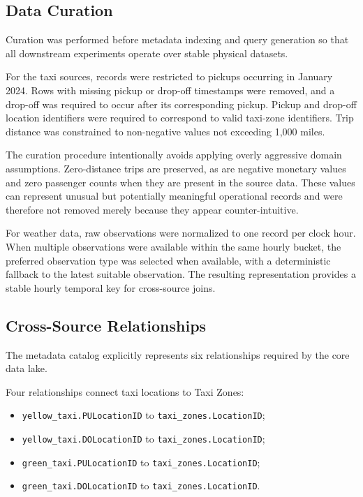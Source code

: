 \subsection{Data Curation}

Curation was performed before metadata indexing and query generation so that
all downstream experiments operate over stable physical datasets.

For the taxi sources, records were restricted to pickups occurring in January
2024. Rows with missing pickup or drop-off timestamps were removed, and a
drop-off was required to occur after its corresponding pickup. Pickup and
drop-off location identifiers were required to correspond to valid taxi-zone
identifiers. Trip distance was constrained to non-negative values not
exceeding 1,000 miles.

The curation procedure intentionally avoids applying overly aggressive domain
assumptions. Zero-distance trips are preserved, as are negative monetary
values and zero passenger counts when they are present in the source data.
These values can represent unusual but potentially meaningful operational
records and were therefore not removed merely because they appear
counter-intuitive.

For weather data, raw observations were normalized to one record per clock
hour. When multiple observations were available within the same hourly
bucket, the preferred observation type was selected when available, with a
deterministic fallback to the latest suitable observation. The resulting
representation provides a stable hourly temporal key for cross-source joins.


\subsection{Cross-Source Relationships}

The metadata catalog explicitly represents six relationships required by the
core data lake.

Four relationships connect taxi locations to Taxi Zones:

\begin{itemize}

    \item \texttt{yellow\_taxi.PULocationID} to
    \texttt{taxi\_zones.LocationID};

    \item \texttt{yellow\_taxi.DOLocationID} to
    \texttt{taxi\_zones.LocationID};

    \item \texttt{green\_taxi.PULocationID} to
    \texttt{taxi\_zones.LocationID};

    \item \texttt{green\_taxi.DOLocationID} to
    \texttt{taxi\_zones.LocationID}.

\end{itemize}

